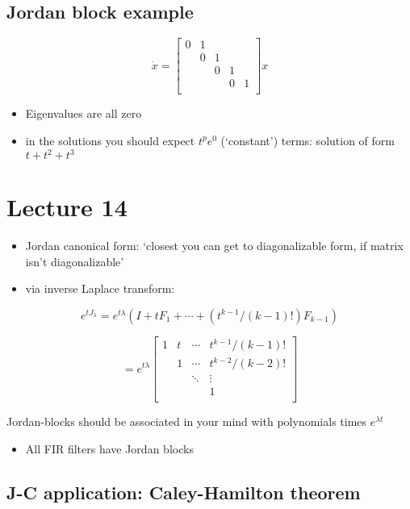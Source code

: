 \documentclass[10pt,letterpaper]{article}
\begin{document}
\subsection{Jordan block example}
\label{sec-11_15}

$$
\dot x=
\begin{bmatrix}
  0 & 1 &   &   &   \\
    & 0 & 1 &   &   \\
    &   & 0 & 1 &   \\
    &   &   & 0 & 1 \\
\end{bmatrix}
x
$$ 
\begin{itemize}
\item Eigenvalues are all zero
\item in the solutions you should expect $t ^{p} e^0$ (`constant') terms: solution of form $t + t ^{2} + t ^{3}$
\end{itemize}
\section{Lecture 14}
\label{sec-12}

\begin{itemize}
\item Jordan canonical form: `closest you can get to diagonalizable form, if matrix isn't diagonalizable'
\item via inverse Laplace transform:
\end{itemize}
$$
e ^{tJ_\lambda} = e ^{t \lambda} (I+t F_1 + \cdots + (t ^{k-1} /(k-1)!) F _{k-1})
$$

$$
= e ^{t \lambda}
\begin{bmatrix}
  1 & t & \cdots & t ^{k-1}/(k-1)! \\
    & 1 & \cdots & t ^{k-2}/(k-2)! \\
    &   & \ddots & \vdots          \\
    &   &        & 1               \\
\end{bmatrix}
$$

Jordan-blocks should be associated in your mind with polynomials times $e ^{\lambda t}$ 
\begin{itemize}
\item All FIR filters have Jordan blocks
\end{itemize}
\subsection{J-C application: Caley-Hamilton theorem}
\label{sec-12_1}
\end{document}
